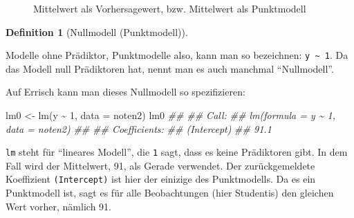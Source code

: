 \documentclass[
  letterpaper,
  twoside,
  open=any]{scrbook}
\newenvironment{Shaded}{\begin{snugshade}}{\end{snugshade}}
\newcommand{\AttributeTok}[1]{\textcolor[rgb]{0.40,0.45,0.13}{#1}}
\newcommand{\DecValTok}[1]{\textcolor[rgb]{0.68,0.00,0.00}{#1}}
\newcommand{\DocumentationTok}[1]{\textcolor[rgb]{0.37,0.37,0.37}{\textit{#1}}}
\newcommand{\FunctionTok}[1]{\textcolor[rgb]{0.28,0.35,0.67}{#1}}
\newcommand{\NormalTok}[1]{\textcolor[rgb]{0.00,0.23,0.31}{#1}}
\newcommand{\OtherTok}[1]{\textcolor[rgb]{0.00,0.23,0.31}{#1}}
\newcommand{\SpecialCharTok}[1]{\textcolor[rgb]{0.37,0.37,0.37}{#1}}
\theoremstyle{definition}
\theoremstyle{definition}
\theoremstyle{definition}
\newtheorem{definition}{Definition}[chapter]
\theoremstyle{remark}
\begin{document}
\begin{figure}


\caption{\label{fig-noten3}Mittelwert als Vorhersagewert, bzw.
Mittelwert als Punktmodell}

\end{figure}%

\begin{definition}[Nullmodell
(Punktmodell)]\protect\hypertarget{def-nullmodell}{}\label{def-nullmodell}

Modelle ohne Prädiktor, Punktmodelle also, kann man so bezeichnen:
\texttt{y\ \textasciitilde{}\ 1}. Da das Modell null Prädiktoren hat,
nennt man es auch manchmal \enquote{Nullmodell}.

\end{definition}

Auf Errisch kann man dieses Nullmodell so spezifizieren:

\begin{Shaded}
\begin{Highlighting}[]
\NormalTok{lm0 }\OtherTok{\textless{}{-}} \FunctionTok{lm}\NormalTok{(y }\SpecialCharTok{\textasciitilde{}} \DecValTok{1}\NormalTok{, }\AttributeTok{data =}\NormalTok{ noten2)}
\NormalTok{lm0}
\DocumentationTok{\#\# }
\DocumentationTok{\#\# Call:}
\DocumentationTok{\#\# lm(formula = y \textasciitilde{} 1, data = noten2)}
\DocumentationTok{\#\# }
\DocumentationTok{\#\# Coefficients:}
\DocumentationTok{\#\# (Intercept)  }
\DocumentationTok{\#\#        91.1}
\end{Highlighting}
\end{Shaded}

\texttt{lm} steht für \enquote{lineares Modell}, die \texttt{1} sagt,
dass es keine Prädiktoren gibt. In dem Fall wird der Mittelwert, 91, als
Gerade verwendet. Der zurückgemeldete Koeffizient \texttt{(Intercept)}
ist hier der einizige des Punktmodells. Da es ein Punktmodell ist, sagt
es für alle Beobachtungen (hier Studentis) den gleichen Wert vorher,
nämlich 91.
\end{document}
